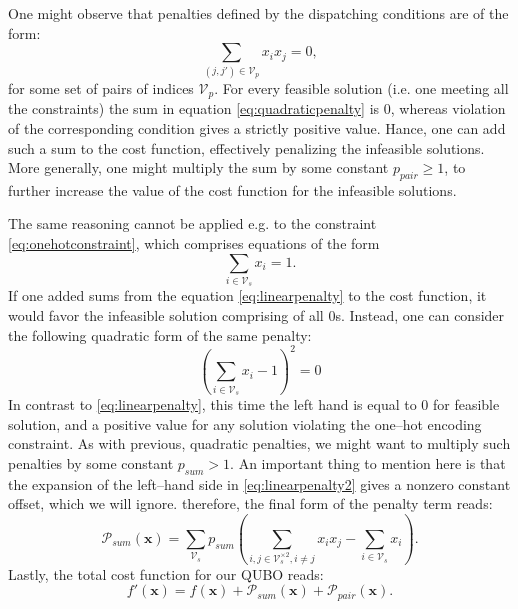 One might observe that penalties defined by the dispatching conditions are of
the form:
\begin{equation}
  \label{eq:quadraticpenalty}
  \sum_{(j, j') \in \mathcal{V}_{p}} x_{i}x_{j} = 0,
\end{equation}
for some set of pairs of indices $\mathcal{V}_{p}$. For every feasible solution
(i.e. one meeting all the constraints) the sum in equation
\eqref{eq:quadraticpenalty} is 0, whereas violation of the corresponding
condition gives a strictly positive value. Hance, one can add such a sum to the
cost function, effectively penalizing the infeasible solutions. More generally,
one might multiply the sum by some constant $p_{pair} \ge 1$, to further
increase the value of the cost function for the infeasible solutions.

The same reasoning cannot be applied e.g. to the constraint \eqref{eq:onehotconstraint},
which comprises equations of the form
\begin{equation}
  \label{eq:linearpenalty}
  \sum_{i \in \mathcal{V}_{s}}x_{i} = 1.
\end{equation}
If one added sums from the equation \eqref{eq:linearpenalty} to the cost
function, it would favor the infeasible solution comprising of all 0s. Instead,
one can consider the following quadratic form of the same penalty:
\begin{equation}
  \label{eq:linearpenalty2}
  \left(\sum_{i \in \mathcal{V}_{s}}x_{i} -1 \right)^{2} = 0
\end{equation}
In contrast to \eqref{eq:linearpenalty}, this time the left hand is equal to 0
for feasible solution, and a positive value for any solution violating the
one--hot encoding constraint. As with previous, quadratic penalties, we might
want to multiply such penalties by some constant $p_{sum} > 1$. An important
thing to mention here is that the expansion of the left--hand side in
\eqref{eq:linearpenalty2} gives a nonzero constant offset, which we will
ignore. therefore, the final form of the penalty term reads:
\begin{equation}
  \mathcal{P}_{sum}(\mathbf{x}) = \sum_{\mathcal{V}_{s}}p_{sum}\left(\sum_{i,j \in \mathcal{V}_{s}^{\times 2}, i\ne j} x_{i}x_{j}  - \sum_{i \in \mathcal{V}_{s}}x_{i}\right).
\end{equation}
Lastly, the total cost function for our QUBO reads:
\begin{equation}
  f'(\mathbf{x}) = f(\mathbf{x}) + \mathcal{P}_{sum}(\mathbf{x}) + \mathcal{P}_{pair}(\mathbf{x}).
\end{equation}
